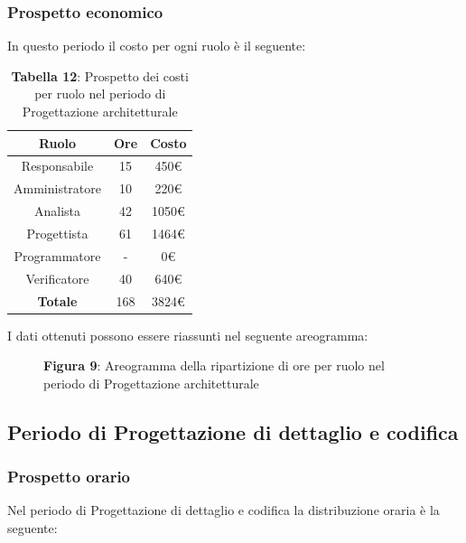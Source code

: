 \subsubsection{Prospetto economico}
In questo periodo il costo per ogni ruolo è il seguente:

\begin{table}[H]
	\centering
	\renewcommand{\arraystretch}{1.5}
	\begin{tabular}{|c|c|c|}
		\hline
		\rowcolor{lighter-grayer}
Ruolo & Ore & Costo \\ \hline
Responsabile & 15 & 450\euro \\ \hline
Amministratore & 10 & 220\euro \\ \hline
Analista & 42 & 1050\euro \\ \hline
Progettista & 61 & 1464\euro \\ \hline
Programmatore & - & 0\euro \\ \hline
Verificatore & 40 & 640\euro \\ \hline
\textbf{Totale} & 168 & 3824\euro \\ \hline
	\end{tabular}
	\caption*{\textbf{Tabella 12}: Prospetto dei costi per ruolo nel periodo di Progettazione architetturale\\}
\end{table}

I dati ottenuti possono essere riassunti nel seguente areogramma:


\begin{figure}[H]
	\centering
	\caption*{\textbf{Figura 9}: Areogramma della ripartizione di ore per ruolo nel periodo di Progettazione architetturale}
	\label{fig:Figura10}
\end{figure}



\subsection{Periodo di Progettazione di dettaglio e codifica}
\subsubsection{Prospetto orario}
Nel periodo di Progettazione di dettaglio e codifica la distribuzione oraria è la seguente:

